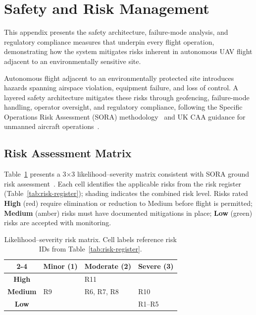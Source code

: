 \section{Safety and Risk Management}\label{sec:safety}

This appendix presents the safety architecture, failure-mode analysis, and regulatory compliance measures that underpin every flight operation, demonstrating how the system mitigates risks inherent in autonomous UAV flight adjacent to an environmentally sensitive site.

Autonomous flight adjacent to an environmentally protected site introduces hazards spanning airspace violation, equipment failure, and loss of control. A layered safety architecture mitigates these risks through geofencing, failure-mode handling, operator oversight, and regulatory compliance, following the Specific Operations Risk Assessment (SORA) methodology~\cite{jarus2019sora} and UK CAA guidance for unmanned aircraft operations~\cite{caa2024uas}.

\subsection{Risk Assessment Matrix}\label{sec:risk-matrix}

Table~\ref{tab:risk-matrix} presents a 3$\times$3 likelihood--severity matrix consistent with SORA ground risk assessment~\cite{jarus2019sora}. Each cell identifies the applicable risks from the risk register (Table~\ref{tab:risk-register}); shading indicates the combined risk level. Risks rated \textbf{High} (red) require elimination or reduction to Medium before flight is permitted; \textbf{Medium} (amber) risks must have documented mitigations in place; \textbf{Low} (green) risks are accepted with monitoring.

\begin{table}[htbp]
\centering
\caption{Likelihood--severity risk matrix. Cell labels reference risk IDs from Table~\ref{tab:risk-register}.}
\label{tab:risk-matrix}
\small
\setlength{\tabcolsep}{4pt}
\begin{tabular}{c|>{\centering\arraybackslash}p{3.4cm}|>{\centering\arraybackslash}p{3.4cm}|>{\centering\arraybackslash}p{3.4cm}|}
\cline{2-4}
 & \textbf{Minor (1)} & \textbf{Moderate (2)} & \textbf{Severe (3)} \\
\hline
\multicolumn{1}{|c|}{\textbf{High}} & \cellcolor{yellow!30} & \cellcolor{red!25}R11 & \cellcolor{red!25} \\
\hline
\multicolumn{1}{|c|}{\textbf{Medium}} & \cellcolor{green!20}R9 & \cellcolor{yellow!30}R6, R7, R8 & \cellcolor{red!25}R10 \\
\hline
\multicolumn{1}{|c|}{\textbf{Low}} & \cellcolor{green!20} & \cellcolor{green!20} & \cellcolor{yellow!30}R1--R5 \\
\hline
\end{tabular}
\end{table}

